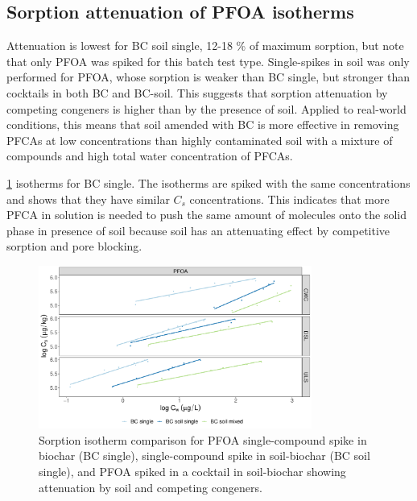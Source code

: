 \subsection{Sorption attenuation of PFOA isotherms}
Attenuation is lowest for BC soil single, 12-18 \% of maximum sorption, but note that only PFOA was spiked for this batch test type. Single-spikes in soil was only performed for PFOA, whose sorption is weaker than BC single, but stronger than cocktails in both BC and BC-soil. This suggests that sorption attenuation by competing congeners is higher than by the presence of soil. Applied to real-world conditions, this means that soil amended with BC is more effective in removing PFCAs at low concentrations than highly contaminated soil with a mixture of compounds and high total water concentration of PFCAs.

\cref{fig:PFOA_attenuation} isotherms for BC single. The isotherms are spiked with the same concentrations and shows that they have similar $C_s$ concentrations. This indicates that more PFCA in solution is needed to push the same amount of molecules onto the solid phase in presence of soil because soil has an attenuating effect by competitive sorption and pore blocking. 

\begin{figure}[htb]
    \centering
    \includegraphics[width=0.8\textwidth]{R/figs/Attenuation_isotherms_PFOA.pdf}
    \caption{Sorption isotherm comparison for PFOA single-compound spike in biochar (BC single), single-compound spike in soil-biochar (BC soil single), and PFOA spiked in a cocktail in soil-biochar showing attenuation by soil and competing congeners.}
    \label{fig:PFOA_attenuation}
\end{figure}

